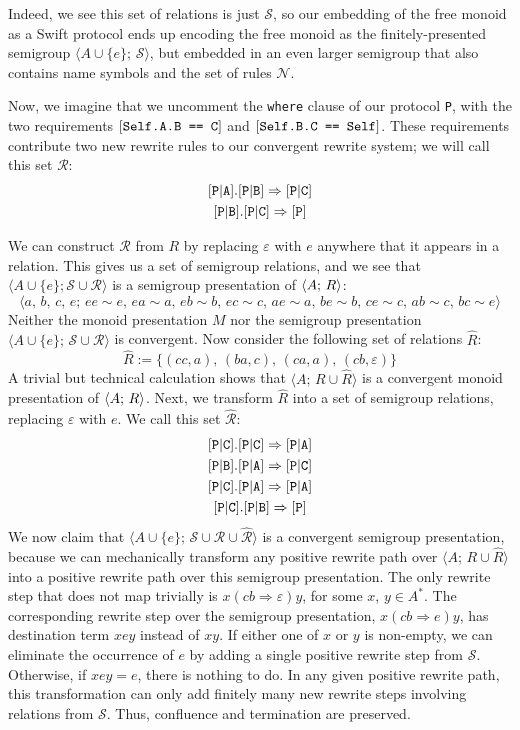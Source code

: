 \documentclass[../generics]{subfiles}
\begin{document}
\begin{example}
Indeed, we see this set of relations is just $\mathcal{S}$, so our embedding of the free monoid as a Swift protocol ends up encoding the free monoid as the finitely-presented semigroup $\langle A\cup\{e\};\,\mathcal{S}\rangle$, but embedded in an even larger semigroup that also contains name symbols and the set of rules $\mathcal{N}$.

Now, we imagine that we uncomment the \texttt{where} clause of our protocol \texttt{P}, with the two requirements $[\texttt{Self.A.B == C}]$ and $[\texttt{Self.B.C == Self}]$. These requirements contribute two new rewrite rules to our convergent rewrite system; we will call this set $\mathcal{R}$:
\begin{gather*}
\assocsym{P}{A}.\assocsym{P}{B}\Rightarrow\assocsym{P}{C}\\
\assocsym{P}{B}.\assocsym{P}{C}\Rightarrow\protosym{P}
\end{gather*}

We can construct $\mathcal{R}$ from $R$ by replacing $\varepsilon$ with $e$ anywhere that it appears in a relation. This gives us a set of semigroup relations, and we see that $\langle A\cup\{e\}; \mathcal{S}\cup\mathcal{R} \rangle$ is a semigroup presentation of $\langle A;\,R\rangle$:
\[\langle a,\,b,\,c,\,e;\,ee\sim e,\,ea\sim a,\,eb\sim b,\,ec\sim c,\,ae\sim a,\,be\sim b,\,ce\sim c,\,ab\sim c,\,bc\sim e\rangle\]
Neither the monoid presentation $M$ nor the semigroup presentation $\langle A\cup\{e\};\,\mathcal{S}\cup\mathcal{R}\rangle$ is convergent. Now consider the following set of relations $\hat{R}$:
\[\hat{R} := \{(cc,a),\,(ba,c),\,(ca,a),\,(cb,\varepsilon)\}\]
A trivial but technical calculation shows that $\langle A;\,R\cup\hat{R}\rangle$ is a convergent monoid presentation of $\langle A;\,R\rangle$. Next, we transform $\hat{R}$ into a set of semigroup relations, replacing $\varepsilon$ with $e$. We call this set $\hat{\mathcal{R}}$:
\begin{gather*}
\assocsym{P}{C}.\assocsym{P}{C}\Rightarrow\assocsym{P}{A}\\
\assocsym{P}{B}.\assocsym{P}{A}\Rightarrow\assocsym{P}{C}\\
\assocsym{P}{C}.\assocsym{P}{A}\Rightarrow\assocsym{P}{A}\\
\assocsym{P}{C}.\assocsym{P}{B}\Rightarrow\protosym{P}
\end{gather*}
We now claim that $\langle A\cup\{e\};\,\mathcal{S}\cup\mathcal{R}\cup\hat{\mathcal{R}}\rangle$ is a convergent semigroup presentation, because we can mechanically transform any positive rewrite path over $\langle A;\,R\cup\hat{R}\rangle$ into a positive rewrite path over this semigroup presentation. The only rewrite step that does not map trivially is $x(cb\Rightarrow\varepsilon)y$, for some $x$, $y\in A^*$. The corresponding rewrite step over the semigroup presentation, $x(cb\Rightarrow e)y$, has destination term $xey$ instead of $xy$. If either one of $x$ or $y$ is non-empty, we can eliminate the occurrence of $e$ by adding a single positive rewrite step from $\mathcal{S}$. Otherwise, if $xey=e$, there is nothing to do. In any given positive rewrite path, this transformation can only add finitely many new rewrite steps involving relations from $\mathcal{S}$. Thus, confluence and termination are preserved.


\end{example}
\end{document}

